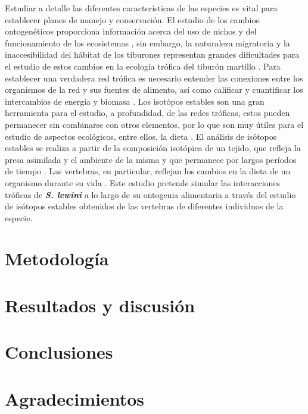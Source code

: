\documentclass[12pt, letterpaper] {article}
\begin{document}
Estudiar  a detalle las diferentes caracter\'isticas de las especies es vital para establecer planes de manejo y conservaci\'on.  El estudio de los cambios ontogen\'eticos proporciona informaci\'on acerca del uso de nichos y del funcionamiento de los ecosistemas \cite{sak}, sin embargo, la naturaleza migratoria y la inaccesibilidad del h\'abitat de los tiburones representan grandes dificultades para el estudio de estos cambios en la ecolog\'ia tr\'ofica del tibur\'on martillo \cite{hazen}.  Para establecer una verdadera red tr\'ofica es necesario entender las conexiones entre los organismos de la red y sus fuentes de alimento, as\'i como calificar y cuantificar los intercambios de energ\'ia y biomasa \cite {kling, vander}.  Los isot\'opos estables son una gran herramienta para el estudio, a profundidad, de las redes tr\'oficas, estos pueden permanecer sin combinarse con otros elementos, por lo que son muy \'utiles para el estudio de aspectos ecol\'ogicos, entre ellos, la dieta \cite{zanden}.   El an\'alisis de is\'otopos estables se realiza a partir de la composici\'on isot\'opica de un tejido, que refleja la presa asimilada y el ambiente de la misma y que permanece por largos per\'iodos de tiempo \cite{kim}.  Las vertebras, en particular, reflejan los cambios en la dieta de un organismo durante su vida \cite{koch}.  Este estudio pretende simular las interacciones tr\'oficas de \textbf{\textit{S. lewini}} a lo largo de su ontogenia alimentaria a trav\'es del estudio de is\'otopos estables obtenidos de las vertebras de diferentes individuos de la especie.







\section{Metodolog\'ia}

 
\section{Resultados y discusión}


\section{Conclusiones}
  
\section{Agradecimientos}




\end{document}
